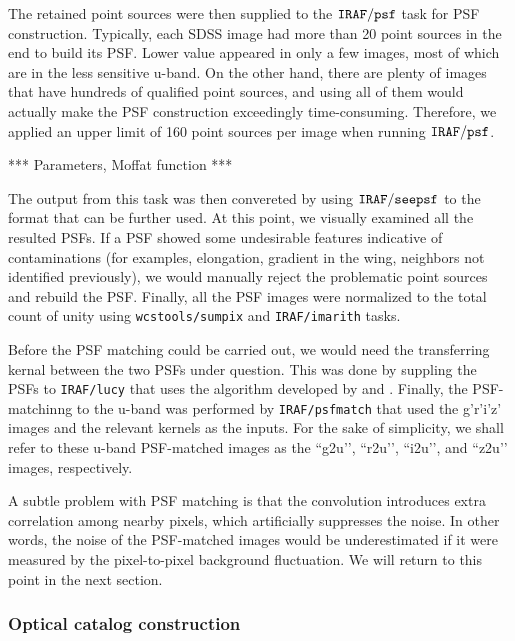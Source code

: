 \documentclass[apj,iop]{emulateapj}
\begin{document}
The retained point sources were then supplied to the $\tt IRAF/psf$ task for PSF construction. Typically, each SDSS image had more than 20 point sources in the end to build its PSF. Lower value appeared in only a few images, most of which are in the less sensitive u-band. On the other hand, there are plenty of images that have hundreds of qualified point sources, and using all of them would actually make the PSF construction exceedingly time-consuming. Therefore, we applied an upper limit of 160 point sources per image when running $\tt IRAF/psf$. 

***
Parameters, Moffat function
***

The output from this task was then convereted by using $\tt IRAF/seepsf$ to the format that can be further used. At this point, we visually examined all the resulted PSFs. If a PSF showed some undesirable features indicative of contaminations (for examples, elongation, gradient in the wing, neighbors not identified previously), we would manually reject the problematic point sources and rebuild the PSF.  Finally, all the PSF images were normalized to the total count of unity using {\tt wcstools/sumpix} \citep{Mink1998b} and {\tt IRAF/imarith} tasks. 

Before the PSF matching could be carried out, we would need the transferring kernal between the two PSFs under question. This was done by suppling the PSFs to {\tt IRAF/lucy} that uses the algorithm developed by \citet{Richardson1972} and \citet{Lucy1974}. Finally, the PSF-matchinng to the u-band was performed by {\tt IRAF/psfmatch} that used the g’r’i’z’ images and the relevant kernels as the inputs. For the sake of simplicity, we shall refer to these u-band PSF-matched images as the ``g2u’’, ``r2u’’, ``i2u’’, and ``z2u’’ images, respectively. 

A subtle problem with PSF matching is that the convolution introduces extra correlation among nearby pixels, which artificially suppresses the noise. In other words, the noise of the PSF-matched images would be underestimated if it were measured by the pixel-to-pixel background fluctuation. We will return to this point in the next section.

\subsubsection{Optical catalog construction}
\end{document}
